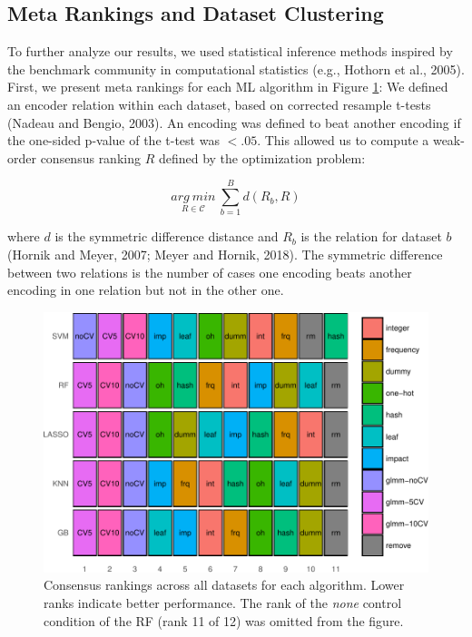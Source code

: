 \documentclass[smallextended]{svjour3}       %
\begin{document}
\hypertarget{meta-rankings-and-dataset-clustering}{%
\subsection{Meta Rankings and Dataset Clustering}\label{meta-rankings-and-dataset-clustering}}

To further analyze our results, we used statistical inference methods inspired by the benchmark community in computational statistics (e.g., Hothorn et al., 2005).
First, we present meta rankings for each ML algorithm in Figure \ref{fig:rank-res}:
We defined an encoder relation within each dataset, based on corrected resample t-tests (Nadeau and Bengio, 2003).
An encoding was defined to beat another encoding if the one-sided p-value of the t-test was \(< .05\).
This allowed us to compute a weak-order consensus ranking \(R\) defined by the optimization problem:

\[ \underset{R \in \mathcal{C}}{arg\ min} \ \sum_{b=1}^B d(R_b, R)\]

where \(d\) is the symmetric difference distance and \(R_b\) is the relation for dataset \(b\) (Hornik and Meyer, 2007; Meyer and Hornik, 2018).
The symmetric difference between two relations is the number of cases one encoding beats another encoding in one relation but not in the other one.



\begin{figure}
\includegraphics[width=\textwidth,height=.55\textwidth]{rank-res-1} \caption{Consensus rankings across all datasets for each algorithm. Lower ranks indicate better performance. The rank of the \emph{none} control condition of the RF (rank 11 of 12) was omitted from the figure.}\label{fig:rank-res}
\end{figure}
\end{document}
